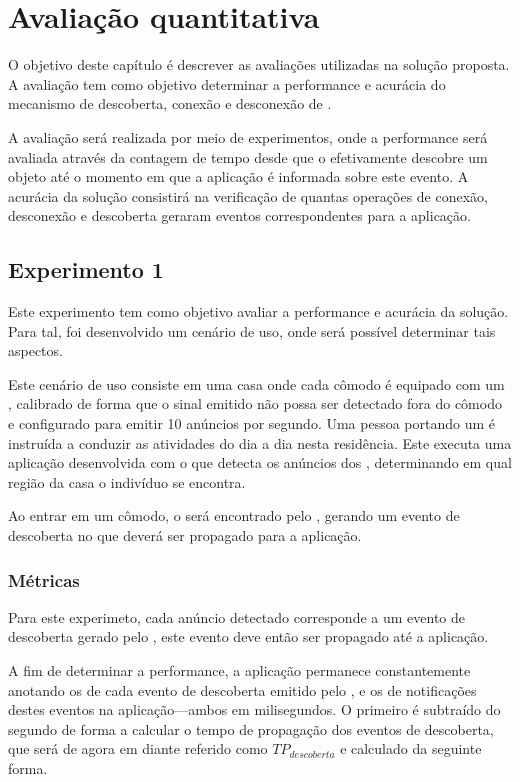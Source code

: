 \chapter{Avaliação quantitativa}\label{chap:avaliacao}

O objetivo deste capítulo é descrever as avaliações utilizadas na solução proposta. A avaliação tem como objetivo determinar a performance e acurácia do mecanismo de descoberta, conexão e desconexão de \smartobjs{}.

A avaliação será realizada por meio de experimentos, onde a performance será avaliada através da contagem de tempo desde que o \mhub{} efetivamente descobre um objeto até o momento em que a aplicação é informada sobre este evento. A acurácia da solução consistirá na verificação de quantas operações de conexão, desconexão e descoberta geraram eventos correspondentes para a aplicação.

\section{Experimento 1}\label{chap:avaliacao-experimento1}

Este experimento tem como objetivo avaliar a performance e acurácia da solução. Para tal, foi desenvolvido um cenário de uso, onde será possível determinar tais aspectos.

Este cenário de uso consiste em uma casa onde cada cômodo é equipado com um \beacon{} \ble{}, calibrado de forma que o sinal emitido não possa ser detectado fora do cômodo e configurado para emitir 10 anúncios por segundo. Uma pessoa portando um \smartphone{} é instruída a conduzir as atividades do dia a dia nesta residência. Este \smartphone{} executa uma aplicação desenvolvida com o \middleware{} \mhubcddl{} que detecta os anúncios dos \beacons{}, determinando em qual região da casa o indivíduo se encontra.

Ao entrar em um cômodo, o \beacon{} será encontrado pelo \mhubcddl{}, gerando um evento de descoberta no \stwopa{} que deverá ser propagado para a aplicação.

\subsection{Métricas}

Para este experimeto, cada anúncio detectado corresponde a um evento de descoberta gerado pelo \stwopa{}, este evento deve então ser propagado até a aplicação.

A fim de determinar a performance, a aplicação permanece constantemente anotando os \timestamps{} de cada evento de descoberta emitido pelo \stwopa{}, e os \timestamps{} de notificações destes eventos na aplicação---ambos em milisegundos. O primeiro \timestamp{} é subtraído do segundo de forma a calcular o tempo de propagação dos eventos de descoberta, que será de agora em diante referido como $TP_{descoberta}$ e calculado da seguinte forma. 

